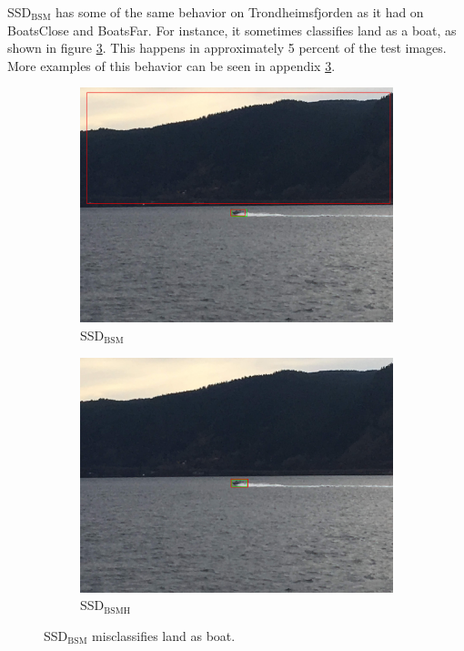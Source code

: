 SSD$_{\text{BSM}}$ has some of the same behavior on Trondheimsfjorden as it had on BoatsClose and BoatsFar. For instance, it sometimes classifies land as a boat, as shown in figure \ref{fig:ssd_trf_bigbox}. This happens in approximately 5 percent of the test images. More examples of this behavior can be seen in appendix \ref{fig:ssd_trf_bigbox}.

\begin{figure}[h!]
\begin{subfigure}{.5\textwidth}
  \centering
  \includegraphics[width=0.8\linewidth]{results/case_buildings/ssdtrf/ssd2/grov2/IMG_2325.jpg}
  \caption{SSD$_{\text{BSM}}$}
  \label{fig:ex_trf_prec_rec_yolo}
\end{subfigure}%
\begin{subfigure}{.5\textwidth}
  \centering
  \includegraphics[width=.8\linewidth]{results/case_buildings/ssdtrf/ssd3/grov2/IMG_2325.jpg}
  \caption{SSD$_{\text{BSMH}}$}
  \label{fig:ex_trf_prec_rec_ssd}
\end{subfigure}
\caption{SSD$_{\text{BSM}}$ misclassifies land as boat.}
\label{fig:ssd_trf_bigbox}
\end{figure}

